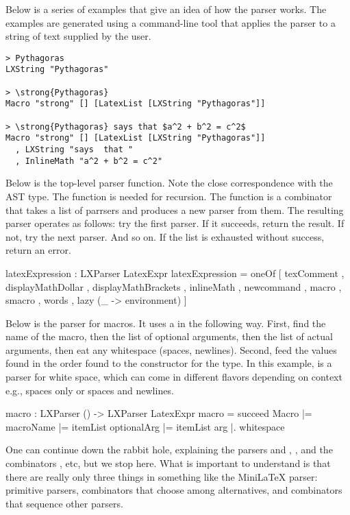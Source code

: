Below is a series of examples that give an idea of how the parser works.  The examples are generated using a command-line tool that applies the parser to a string of text supplied by the user.

\begin{verbatim}
> Pythagoras
LXString "Pythagoras"

> \strong{Pythagoras}
Macro "strong" [] [LatexList [LXString "Pythagoras"]]

> \strong{Pythagoras} says that $a^2 + b^2 = c^2$
Macro "strong" [] [LatexList [LXString "Pythagoras"]]
  , LXString "says  that "
  , InlineMath "a^2 + b^2 = c^2"
\end{verbatim}


Below is the top-level parser function.  Note the close correspondence
with the AST type.  The  function is needed for recursion.  The  function is a combinator that takes a list of parrsers and produces a new parser from them.  The resulting parser operates as follows: try the first parser.  If it succeeds, return the result.  If not, try the next parser.  And so on.  If the list is exhausted without success, return an error.

\begin{listing}
latexExpression : LXParser LatexExpr
latexExpression =
    oneOf
        [ texComment
        , displayMathDollar
        , displayMathBrackets
        , inlineMath
        , newcommand
        , macro
        , smacro
        , words
        , lazy (\_ -> environment)
        ]
\end{listing}

Below is the parser for macros.  It uses a  in the following way.   First, find the name of the macro, then the list of optional arguments, then the list of  actual arguments, then eat any whitespace (spaces, newlines).  Second, feed the values found in the order found to the constructor  for the  type.  In this example,  is a parser for white space, which can come in different flavors depending on context e.g., spaces only or spaces and newlines.

\begin{listing}
macro : LXParser () -> LXParser LatexExpr
macro =
    succeed Macro
        |= macroName
        |= itemList optionalArg
        |= itemList arg
        |. whitespace
\end{listing}

One can continue down the rabbit hole, explaining the parsers and , ,   and the combinators , etc, but we stop here.  What is important to understand is that there are really only three things in something like the MiniLaTeX parser: primitive parsers, combinators that choose among alternatives, and combinators that sequence other parsers.

